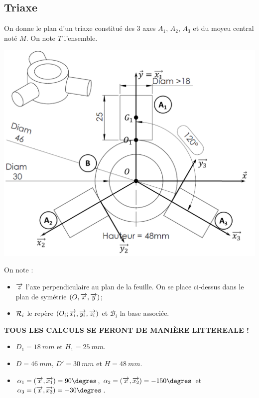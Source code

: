 \documentclass[10pt,fleqn]{article} %
\begin{document}
\begin{multicols}{2}
\section*{Triaxe}
\setcounter{exo}{0}
On donne le plan d'un triaxe constitué des 3 axes $A_1$, $A_2$, $A_3$ et du moyeu central noté $M$. On note  $T$ l'ensemble.

\begin{center}
\includegraphics[width=\linewidth]{images/triaxe.png}
\end{center}
On note :
\begin{itemize}
\item $\overrightarrow{z}$ l'axe perpendiculaire au plan de la feuille. On se place ci-dessus dans le plan de symétrie $\left(O,\overrightarrow{x},\overrightarrow{y}\right)$;
\item $\mathcal{R}_{i}$ le repère $\left(O_i;\overrightarrow{x_i},\overrightarrow{y_i},\overrightarrow{z_i} \right)$ et $\mathcal{B}_i$ la base associée.
\end{itemize}



\textbf{TOUS LES CALCULS SE FERONT DE MANIÈRE LITTEREALE !}
\begin{itemize}
\item $D_1=\SI{18}{mm}$ et $H_1=\SI{25}{mm}$.
\item $D=\SI{46}{mm}$, $D'=\SI{30}{mm}$ et $H=\SI{48}{mm}$.
\item $\alpha_1=\angl{x}{x_1}=90\degres$, $\alpha_2=\angl{x}{x_2}=-150\degres$ et 
$\alpha_3=\angl{x}{x_3}=-30\degres$.
\end{itemize}


\end{multicols}
\end{document}
